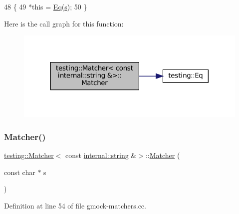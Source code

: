 \begin{DoxyCode}
48                                                                \{
49   *\textcolor{keyword}{this} = \hyperlink{namespacetesting_a0cb8ba7eae844c871eccb29e7c81635f}{Eq}(\hyperlink{namespaceservice__node__3_aa976421a49e0b54f23833423400849ae}{s});
50 \}
\end{DoxyCode}
Here is the call graph for this function\+:
\nopagebreak
\begin{figure}[H]
\begin{center}
\leavevmode
\includegraphics[width=317pt]{classtesting_1_1Matcher_3_01const_01internal_1_1string_01_6_4_a5014c9227335b575a1c0167b9c609bf8_cgraph}
\end{center}
\end{figure}
\mbox{\label{classtesting_1_1Matcher_3_01const_01internal_1_1string_01_6_4_accc8b69db530a019efa2a1d6436eb3db}} 
\subsubsection{\texorpdfstring{Matcher()}{Matcher()}\hspace{0.1cm}{\footnotesize\ttfamily [4/4]}}
{\footnotesize\ttfamily \hyperlink{classtesting_1_1Matcher}{testing\+::\+Matcher}$<$ const \hyperlink{namespacetesting_1_1internal_a8e8ff5b11e64078831112677156cb111}{internal\+::string} \&$>$\+::\hyperlink{classtesting_1_1Matcher}{Matcher} (\begin{DoxyParamCaption}\item[{const char $\ast$}]{s }\end{DoxyParamCaption})}



Definition at line 54 of file gmock-\/matchers.\+cc.



